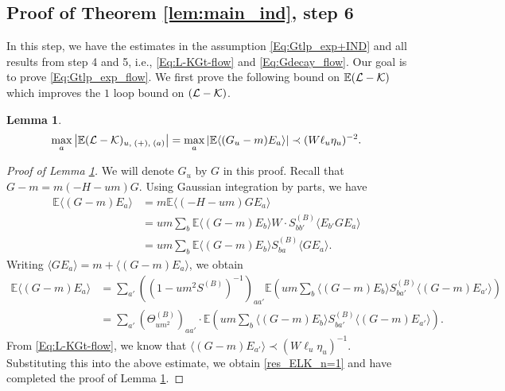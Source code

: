 \documentclass[10pt,reqno]{article}
\theoremstyle{plain} %
\newtheorem{lemma}[theorem]{Lemma}
\theoremstyle{remark}
\numberwithin{equation}{section}
\begin{document}
 


 \subsection{Proof of Theorem \ref{lem:main_ind}, step 6}\label{sec:step6E}
In this step, we have the estimates in the assumption \eqref{Eq:Gtlp_exp+IND} and all  results from step 4 and 5, i.e., \eqref{Eq:L-KGt-flow} and \eqref{Eq:Gdecay_flow}. Our goal is to prove \eqref{Eq:Gtlp_exp_flow}. 
We first  prove the following bound on   $\mathbb E{(\cal L-\cal K)}$ which improves the $1$ loop bound on  ${(\cal L-\cal K)}$.
\begin{lemma}\label{lem_ELK_n=1}
  \begin{align}\label{res_ELK_n=1}
  \max_a \left|\mathbb E({\cal L-\cal K})_{u, \;(+),\; (a)} \right|=  \max_a  \left|\mathbb E\langle (G_u-m) E_a\rangle\right|
  \prec (W\ell_u\eta_u)^{-2}  .
  \end{align} 
\end{lemma}
\begin{proof}[Proof of Lemma \ref{lem_ELK_n=1}]
We will denote $G_u$ by $G$ in this proof.  
Recall that $G-m=m(-H-um)G$. Using Gaussian integration by parts, we have  
\begin{align}
    \mathbb{E} \langle (G - m) E_a \rangle &= m \mathbb{E} \langle (-H - um) G E_a \rangle \nonumber \\
    &= u m \sum_b \mathbb{E} \langle (G - m) E_b \rangle W \cdot S^{(B)}_{bb'} \langle E_{b'} G E_a \rangle \nonumber \\
    &= u m \sum_b \mathbb{E} \langle (G - m) E_b \rangle S^{(B)}_{ba} \langle G E_a \rangle.
\end{align}
Writing $\langle G E_a \rangle = m + \langle (G - m) E_a \rangle$, we obtain  
\begin{align}
    \mathbb{E} \langle (G - m) E_a \rangle 
    &= \sum_{a'} \left((1 - um^2 S^{(B)})^{-1}\right)_{aa'} \mathbb{E} \left( um \sum_b \langle (G - m) E_b \rangle S^{(B)}_{ba'} \langle (G - m) E_{a'} \rangle \right) \nonumber \\
    &= \sum_{a'} \left(\Theta^{(B)}_{um^2}\right)_{aa'} \cdot \mathbb{E} \left( um \sum_b \langle (G - m) E_b \rangle S^{(B)}_{ba'} \langle (G - m) E_{a'} \rangle \right).
\end{align}
From \eqref{Eq:L-KGt-flow}, we know that $\langle (G - m) E_{a'} \rangle \prec (W \ell_u \eta_u)^{-1}$. Substituting this into the above estimate, we obtain \eqref{res_ELK_n=1} and  have completed the proof of Lemma \ref{lem_ELK_n=1}.
\end{proof}
\end{document}
